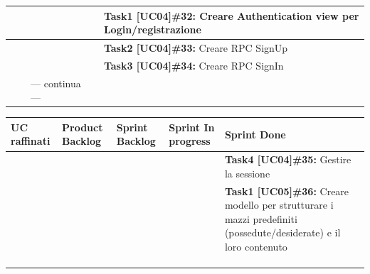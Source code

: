 \begin{landscape}
\begin{itemize}
\begin{tabular}{ | p{5cm} | p{3cm} | p{5cm} | p{5cm} | p{5cm}| }
                \hline
                & &  & & \textbf{Task1 [UC04]\#32:} Creare Authentication view per Login/registrazione \\
                \hline
                & &   & & \textbf{Task2 [UC04]\#33:} Creare RPC SignUp \\
                \hline
                & &   & & \textbf{Task3 [UC04]\#34:} Creare RPC SignIn  \\
                \hline
                & & --- continua --- & & \\
                \hline
            \end{tabular}
            \newpage

            \begin{tabular}{ | p{5cm} | p{3cm} | p{5cm} | p{5cm} | p{5cm}| }
                \hline
                \textbf{UC raffinati}
                & \textbf{Product Backlog}
                & \textbf{Sprint Backlog}
                & \textbf{Sprint In progress}
                & \textbf{Sprint Done} \\
                \hline
                \hline
                & &   & & \textbf{Task4 [UC04]\#35:} Gestire la sessione\\
                \hline
                & &   & & \textbf{Task1 [UC05]\#36:} Creare modello per strutturare i mazzi predefiniti (possedute/desiderate) e il loro contenuto\\
                \hline
                & &   & & \\
                \hline
                & &   & & \\
                \hline
                & & & & \\
                \hline
            \end{tabular}
        \end{itemize}

        \newpage

\end{landscape}

